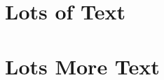 \documentclass[a4paper,openany]{book}
\begin{document}

\chapter{Lots of Text}

\begin{multicols}{2}

\noindent
\lipsum


\end{multicols}

\chapter{Lots More Text}

\begin{multicols}{2}

\noindent
\lipsum


\end{multicols}
\end{document}
